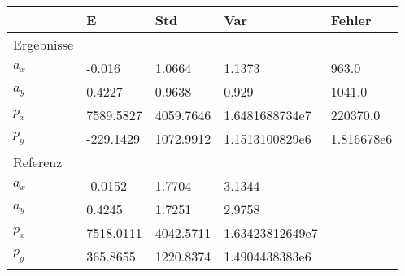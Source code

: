 \begin{tabular}{l|l|l|l|l}

     & E   & Std    & Var    & Fehler \\ 

\hline 

\hline 


Ergebnisse & & & & \\ 

$a_x$  & -0.016 & 1.0664 & 1.1373 & 963.0 \\ 

$a_y$  & 0.4227 & 0.9638 & 0.929 & 1041.0 \\ 

$p_x$  & 7589.5827 & 4059.7646 & 1.6481688734e7 & 220370.0 \\ 

$p_y$  & -229.1429 & 1072.9912 & 1.1513100829e6 & 1.816678e6 \\ 


\hline 

Referenz & & & & \\ 

$a_x$  & -0.0152 & 1.7704 & 3.1344 & \\ 

$a_y$  & 0.4245 & 1.7251 & 2.9758 & \\ 

$p_x$  & 7518.0111 & 4042.5711 & 1.63423812649e7 & \\ 

$p_y$  & 365.8655 & 1220.8374 & 1.4904438383e6 & \\ 

\end{tabular}
